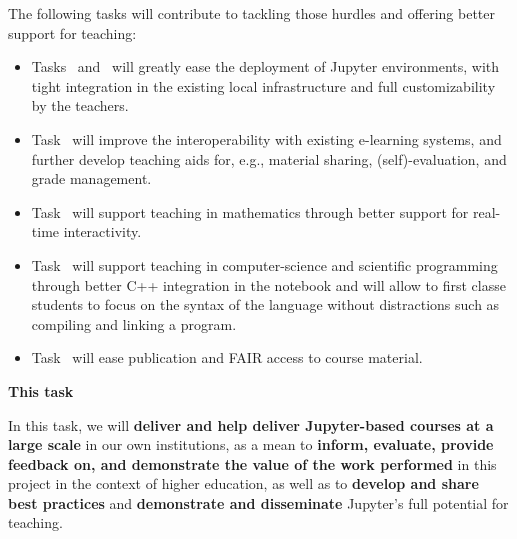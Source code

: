 \begin{task}[
  title=Demonstrator: enriched teaching with Jupyter,
  id=teaching,
  lead=EP,
  PM=6, %
  wphases={0-48},
  partners={EGI,UIO,UPSUD,XFEL}
  ]
  The following tasks will contribute to tackling those hurdles and
  offering better support for teaching:
  \begin{itemize}
  \item Tasks~
    and~ will greatly ease the
    deployment of Jupyter environments, with tight integration in the
    existing local infrastructure and full customizability by the
    teachers.
  \item Task~ will improve the
    interoperability with existing e-learning systems, and further
    develop teaching aids for, e.g., material sharing,
    (self)-evaluation, and grade management.
  \item Task~ will support teaching
    in mathematics through better support for real-time interactivity.
  \item Task~ will support teaching
    in computer-science and scientific programming through
    better C++ integration in the notebook and will allow to first classe students to focus on the
    syntax of the language without distractions such as compiling and
    linking a program.
  \item Task~ will ease publication and FAIR
    access to course material.
  \end{itemize}

  \textbf{This task}

  In this task, we will \textbf{deliver and help deliver Jupyter-based
    courses at a large scale} in our own institutions, as a mean to
  \textbf{inform, evaluate, provide feedback on, and demonstrate the
    value of the work performed} in this project in the context of
  higher education, as well as to \textbf{develop and share best
    practices} and \textbf{demonstrate and disseminate} Jupyter's full
  potential for teaching.


\end{task}
